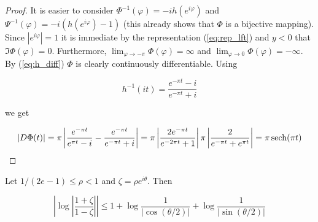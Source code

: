 \begin{proof}
	It is easier to consider $\Phi^{-1}(\varphi) = -i h(e^{i\varphi})$ and $\Psi^{-1}(\varphi) = -i\left( h(e^{i\varphi}) - 1 \right)$ (this already shows that $\Phi$ is a bijective mapping). Since $\left| e^{i\varphi}\right| = 1$ it is immediate by the representation (\ref{eq:rep_lft}) and $y < 0$ that $\Im \Phi(\varphi) = 0$. Furthermore, $\lim_{\varphi \rightarrow -\pi} \Phi(\varphi) = \infty$ and $\lim_{\varphi \rightarrow 0} \Phi(\varphi) = -\infty$. By (\ref{eq:h_diff}) $\Phi$ is clearly continuously differentiable. Using
	
	\begin{equation*}
		h^{-1}(it) = \frac{e^{-\pi t} - i}{e^{-\pi t} + i}
	\end{equation*}
	
	we get

	\begin{gather*}
		\left| D\Phi(t)\right| = \pi\left| \frac{e^{-\pi t}}{e^{\pi t} - i} - \frac{e^{-\pi t}}{e^{-\pi t} + i}\right| = \pi\left| \frac{2e^{-\pi t}}{e^{-2\pi t} + 1}\right| \pi \left| \frac{2}{e^{-\pi t} + e^{\pi t}}\right|= \pi \operatorname{sech}(\pi t)
	\end{gather*}
\end{proof}

\begin{lemma}
	Let $1/(2e - 1) \leqslant \rho < 1$ and $\zeta = \rho e^{i\theta}$. Then

	\begin{equation*}
		\left| \log \left| \frac{1 + \zeta}{1 - \zeta} \right| \right| \leqslant 1 + \log \frac{1}{\left| \cos(\theta/2) \right|} + \log \frac{1}{\left| \sin(\theta/2) \right|}
	\end{equation*}
	\label{lem:upper_bound}
\end{lemma}

